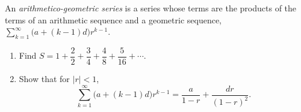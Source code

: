 An \emph{arithmetico-geometric series} is a series whose terms are the products of the terms of an arithmetic sequence and a geometric sequence, $\displaystyle\sum_{k=1}^{\infty}\bigl(a+(k-1)d\bigr)r^{k-1}$.
\begin{enumerate}
\item[(a)] Find $S=1+\dfrac{2}{2}+\dfrac{3}{4}+\dfrac{4}{8}+\dfrac{5}{16}+\cdots$.
\item[(b)] Show that for $|r|<1$,
\[\sum_{k=1}^{\infty}\bigl(a+(k-1)d\bigr)r^{k-1}=\dfrac{a}{1-r}+\dfrac{dr}{(1-r)^2}.\]
\end{enumerate}
